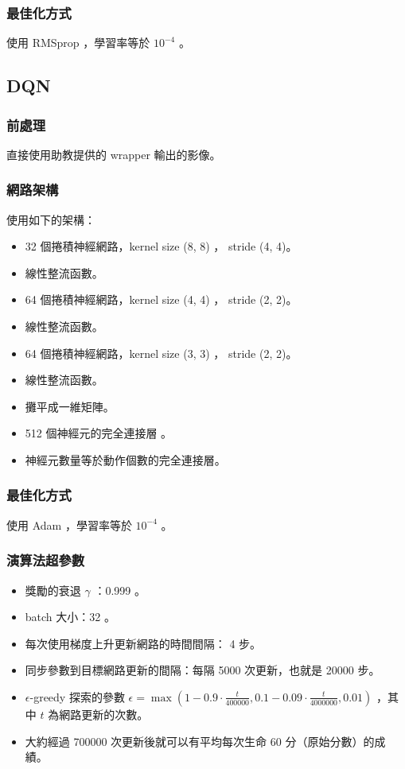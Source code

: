 \documentclass[fleqn,a4paper,12pt]{article}
\begin{document}
\subsubsection*{最佳化方式}

使用 RMSprop ，學習率等於 $10^{-4}$ 。

\subsection{DQN}

\subsubsection*{前處理}

直接使用助教提供的 wrapper 輸出的影像。

\subsubsection*{網路架構}

使用如下的架構：

\begin{itemize}
\item 32 個捲積神經網路，kernel size (8, 8) ， stride (4, 4)。
\item 線性整流函數。
\item 64 個捲積神經網路，kernel size (4, 4) ， stride (2, 2)。
\item 線性整流函數。
\item 64 個捲積神經網路，kernel size (3, 3) ， stride (2, 2)。
\item 線性整流函數。
\item 攤平成一維矩陣。
\item 512 個神經元的完全連接層 。
\item 神經元數量等於動作個數的完全連接層。
\end{itemize}

\subsubsection*{最佳化方式}

使用 Adam ，學習率等於 $10^{-4}$ 。

\subsubsection*{演算法超參數}

\begin{itemize}
\item 獎勵的衰退 $\gamma$ ：0.999 。
\item batch 大小：32 。
\item 每次使用梯度上升更新網路的時間間隔： 4 步。
\item 同步參數到目標網路更新的間隔：每隔 5000 次更新，也就是 20000 步。
\item $\epsilon$-greedy 探索的參數 $\epsilon = \max(1 -  0.9 \cdot \frac{t}{400000}, 0.1 - 0.09 \cdot \frac{t}{4000000}, 0.01)$ ，其中 $t$ 為網路更新的次數。
\item 大約經過 700000 次更新後就可以有平均每次生命 60 分（原始分數）的成績。
\end{itemize}
\end{document}
